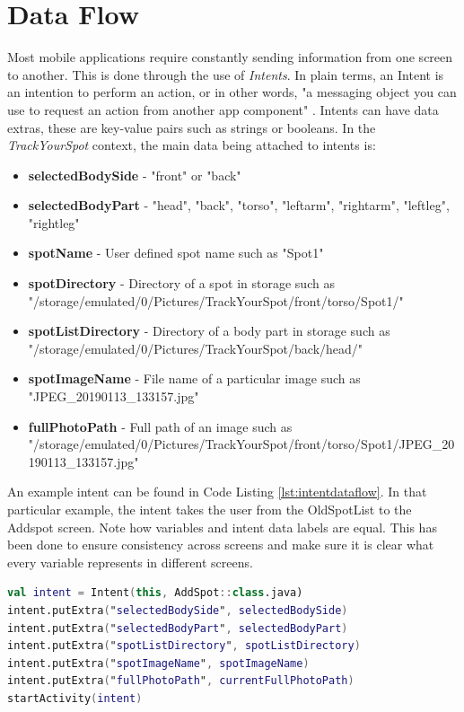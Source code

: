 \section{Data Flow}
Most mobile applications require constantly sending information from one screen to another. This is done through the use of \emph{Intents}. In plain terms, an Intent is an intention to perform an action, or in other words, "a messaging object you can use to request an action from another app component" \cite{intents}. Intents can have data extras, these are key-value pairs such as strings or booleans. In the \emph{TrackYourSpot} context, the main data being attached to intents is:
\begin{itemize}
    \item \textbf{selectedBodySide} - "front" or "back"
    \item \textbf{selectedBodyPart} - "head", "back", "torso", "leftarm", "rightarm", "leftleg", "rightleg"
    \item \textbf{spotName} - User defined spot name such as "Spot1"
    \item \textbf{spotDirectory} - Directory of a spot in storage such as "/storage/emulated/0/Pictures/TrackYourSpot/front/torso/Spot1/"
    \item \textbf{spotListDirectory} - Directory of a body part in storage such as "/storage/emulated/0/Pictures/TrackYourSpot/back/head/"
    \item \textbf{spotImageName} - File name of a particular image such as "JPEG\_20190113\_133157.jpg"
    \item \textbf{fullPhotoPath} - Full path of an image such as "/storage/emulated/0/Pictures/TrackYourSpot/front/torso/Spot1/JPEG\_20190113\_133157.jpg"
\end{itemize}
An example intent can be found in Code Listing \ref{lst:intentdataflow}. In that particular example, the intent takes the user from the OldSpotList to the Addspot screen. Note how variables and intent data labels are equal. This has been done to ensure consistency across screens and make sure it is clear what every variable represents in different screens.

\begin{lstlisting}[caption={Intent Dataflow for the AddSpot class}, 
label={lst:intentdataflow}, language=Kotlin]
val intent = Intent(this, AddSpot::class.java)
intent.putExtra("selectedBodySide", selectedBodySide)
intent.putExtra("selectedBodyPart", selectedBodyPart)
intent.putExtra("spotListDirectory", spotListDirectory)
intent.putExtra("spotImageName", spotImageName)
intent.putExtra("fullPhotoPath", currentFullPhotoPath)
startActivity(intent)
\end{lstlisting}
